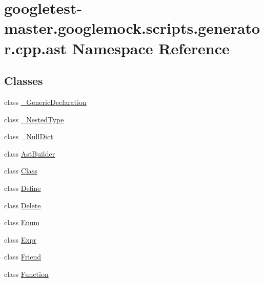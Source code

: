 \hypertarget{namespacegoogletest-master_1_1googlemock_1_1scripts_1_1generator_1_1cpp_1_1ast}{}\section{googletest-\/master.googlemock.\+scripts.\+generator.\+cpp.\+ast Namespace Reference}
\label{namespacegoogletest-master_1_1googlemock_1_1scripts_1_1generator_1_1cpp_1_1ast}
\subsection*{Classes}
\begin{DoxyCompactItemize}
\item 
class \mbox{\hyperlink{classgoogletest-master_1_1googlemock_1_1scripts_1_1generator_1_1cpp_1_1ast_1_1___generic_declaration}{\+\_\+\+Generic\+Declaration}}
\item 
class \mbox{\hyperlink{classgoogletest-master_1_1googlemock_1_1scripts_1_1generator_1_1cpp_1_1ast_1_1___nested_type}{\+\_\+\+Nested\+Type}}
\item 
class \mbox{\hyperlink{classgoogletest-master_1_1googlemock_1_1scripts_1_1generator_1_1cpp_1_1ast_1_1___null_dict}{\+\_\+\+Null\+Dict}}
\item 
class \mbox{\hyperlink{classgoogletest-master_1_1googlemock_1_1scripts_1_1generator_1_1cpp_1_1ast_1_1_ast_builder}{Ast\+Builder}}
\item 
class \mbox{\hyperlink{classgoogletest-master_1_1googlemock_1_1scripts_1_1generator_1_1cpp_1_1ast_1_1_class}{Class}}
\item 
class \mbox{\hyperlink{classgoogletest-master_1_1googlemock_1_1scripts_1_1generator_1_1cpp_1_1ast_1_1_define}{Define}}
\item 
class \mbox{\hyperlink{classgoogletest-master_1_1googlemock_1_1scripts_1_1generator_1_1cpp_1_1ast_1_1_delete}{Delete}}
\item 
class \mbox{\hyperlink{classgoogletest-master_1_1googlemock_1_1scripts_1_1generator_1_1cpp_1_1ast_1_1_enum}{Enum}}
\item 
class \mbox{\hyperlink{classgoogletest-master_1_1googlemock_1_1scripts_1_1generator_1_1cpp_1_1ast_1_1_expr}{Expr}}
\item 
class \mbox{\hyperlink{classgoogletest-master_1_1googlemock_1_1scripts_1_1generator_1_1cpp_1_1ast_1_1_friend}{Friend}}
\item 
class \mbox{\hyperlink{classgoogletest-master_1_1googlemock_1_1scripts_1_1generator_1_1cpp_1_1ast_1_1_function}{Function}}

\end{DoxyCompactItemize}
